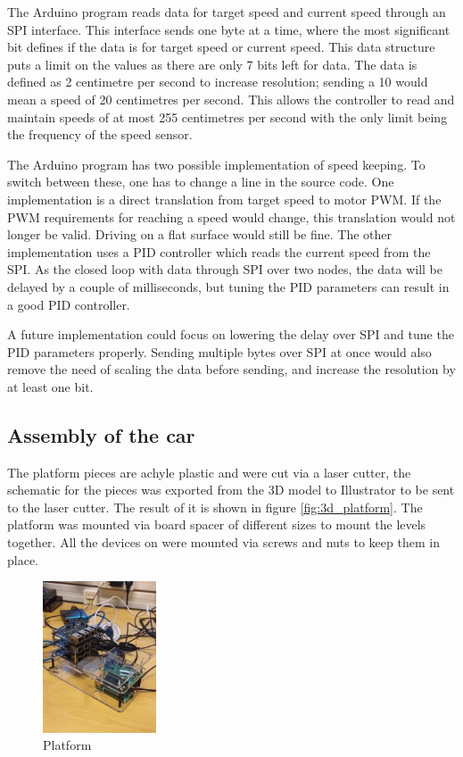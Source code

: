 \documentclass[11pt, titlepage]{article} %
\begin{document}
The Arduino program reads data for target speed and current speed through an SPI interface. This interface sends one byte at a time, where the most significant bit defines if the data is for target speed or current speed. This data structure puts a limit on the values as there are only 7 bits left for data. The data is defined as 2 centimetre per second to increase resolution; sending a 10 would mean a speed of 20 centimetres per second. This allows the controller to read and maintain speeds of at most 255 centimetres per second with the only limit being the frequency of the speed sensor. 

The Arduino program has two possible implementation of speed keeping. To switch between these, one has to change a line in the source code. One implementation is a direct translation from target speed to motor PWM. If the PWM requirements for reaching a speed would change, this translation would not longer be valid. Driving on a flat surface would still be fine. The other implementation uses a PID controller which reads the current speed from the SPI. As the closed loop with data through SPI over two nodes, the data will be delayed by a couple of milliseconds, but tuning the PID parameters can result in a good PID controller.

A future implementation could focus on lowering the delay over SPI and tune the PID parameters properly. Sending multiple bytes over SPI at once would also remove the need of scaling the data before sending, and increase the resolution by at least one bit.

\subsection{Assembly of the car}


The platform pieces are achyle plastic and were cut via a laser cutter, the schematic for the pieces was exported from the 3D model to Illustrator to be sent to the laser cutter. The result of it is shown in figure \ref{fig:3d_platform}. The platform was mounted via board spacer of different sizes to mount the levels together. All the devices on were mounted via screws and nuts to keep them in place. 


\begin{figure}
	\includegraphics[width=0.3\textwidth]{platform_assembely.jpg}
	\caption{Platform}
	\label{fig:platform_ass}
\end{figure}
\end{document}
